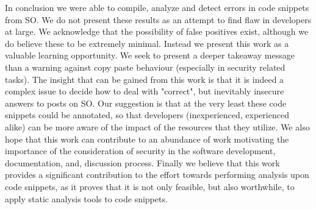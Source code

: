 \documentclass[10pt, conference]{IEEEtran}
\begin{document}
In conclusion we were able to compile, analyze and detect errors in code snippets from SO. We do not present these results as an attempt to find flaw in developers at large. We acknowledge that the possibility of false positives exist, although we do believe these to be extremely minimal. Instead we present this work as a valuable learning opportunity. We seek to present a deeper takeaway message than a warning against copy paste behaviour (especially in security related tasks). The insight that can be gained from this work is that it is indeed a complex issue to decide how to deal with "correct", but inevitably insecure answers to posts on SO. Our suggestion is that at the very least these code snippets could be annotated, so that developers (inexperienced, experienced alike) can be more aware of the impact of the resources that they utilize. We also hope that this work can contribute to an abundance of work motivating the importance of the consideration of security in the software development, documentation, and, discussion process. Finally we believe that this work provides a significant contribution to the effort towards performing analysis upon code snippets, as it proves that it is not only feasible, but also worthwhile, to apply static analysis tools to code snippets.

\printbibliography
\end{document}
